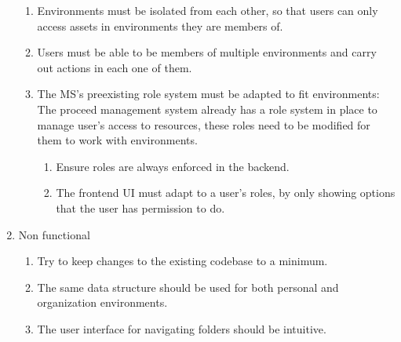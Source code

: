 \begin{enumerate}
\begin{enumerate}
    \item Environments must be isolated from each other, so that users can only access assets in environments they are members of.

    \item Users must be able to be members of multiple environments and carry out actions in each one of them.

    \item The MS's preexisting role system must be adapted to fit environments:
      The proceed management system already has a role system in place to manage user's access to resources, these roles need to be modified for them to work with environments.
    \begin{enumerate}
        \item Ensure roles are always enforced in the backend.
        \item The frontend UI must adapt to a user's roles, by only showing options that the user has permission to do.
    \end{enumerate}

  \end{enumerate}

  \item Non functional
  \begin{enumerate}
    \item Try to keep changes to the existing codebase to a minimum.

    \item The same data structure should be used for both personal and organization environments.


    \item The user interface for navigating folders should be intuitive.


\end{enumerate}
\end{enumerate}
